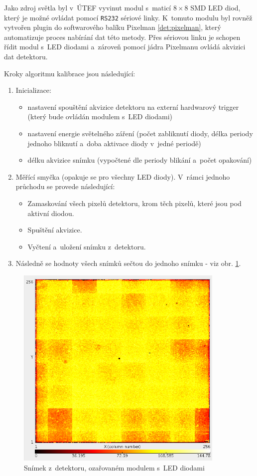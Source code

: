 Jako zdroj světla byl v~ÚTEF vyvinut modul s~maticí $8\times8$ SMD LED diod, který je možné ovládat pomocí \texttt{RS232} sériové linky. K~tomuto modulu byl rovněž vytvořen plugin do softwarového balíku Pixelman \ref{det:pixelman}, který automatizuje proces nabírání dat této metody. Přes sériovou linku je schopen řídit modul s~LED diodami a~zároveň pomocí jádra Pixelmanu ovládá akvizici dat detektoru.

Kroky algoritmu kalibrace jsou následující:
\begin{enumerate}
	\item Inicializace:
		\begin{itemize}
			\item nastavení spouštění akvizice detektoru na externí hardwarový trigger (který bude ovládán modulem s~LED diodami)
			\item nastavení energie světelného záření (počet zabliknutí diody, délka periody jednoho bliknutí a~doba aktivace diody v~jedné periodě)
			\item  délku akvizice snímku (vypočtené dle periody blikání a~počet opakování)
		\end{itemize}
	\item Měřící smyčka (opakuje se pro všechny LED diody). V~rámci jednoho průchodu se provede následující:
		\begin{itemize}
			\item Zamaskování všech pixelů detektoru, krom těch pixelů, které jsou pod aktivní diodou.
			\item Spuštění akvizice.
			\item Vyčtení a~uložení snímku z~detektoru.
		\end{itemize}
	\item Následně se hodnoty všech snímků sečtou do jednoho snímku - viz obr. \ref{fig:calib:led_frame}.
\end{enumerate}

\begin{figure}[th]
	\begin{center}
		\includegraphics[width=10cm]{figures/led_calib_frame.png}
		\caption{Snímek z~detektoru, ozařovaném modulem s~LED diodami}
		\label{fig:calib:led_frame}
	\end{center}
\end{figure}


